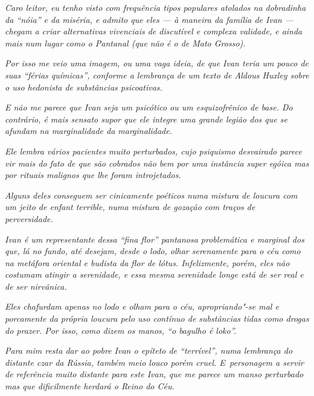 \emph{Caro leitor, eu tenho visto com frequência tipos populares
atolados na dobradinha da ``nóia'' e da miséria, e admito que eles --- à
maneira da família de Ivan --- chegam a criar alternativas vivenciais de
discutível e complexa validade, e ainda mais num lugar como o Pantanal
(que não é o de Mato Grosso).}~

\emph{Por isso me veio uma imagem, ou uma vaga ideia, de que Ivan teria
um pouco de suas ``férias químicas'', conforme a lembrança de um texto
de Aldous Huxley sobre o uso hedonista de substâncias psicoativas.}~

\emph{E não me parece que Ivan seja um psicótico ou um esquizofrênico de
base. Do contrário, é mais sensato supor que ele integre uma grande
legião dos que se afundam na marginalidade da marginalidade.}~

\emph{Ele lembra vários pacientes muito perturbados, cujo psiquismo
desvairado parece vir mais do fato de que são cobrados não bem por uma
instância super egóica mas por rituais malignos que lhe foram
introjetados.}~

\emph{Alguns deles conseguem ser cinicamente poéticos numa mistura de
loucura com um jeito de enfant terrible, numa mistura de gozação com
traços de perversidade.}~

\emph{Ivan é um representante dessa ``fina flor'' pantanosa problemática
e marginal dos que, lá no fundo, até desejam, desde o lodo, olhar
serenamente para o céu como na metáfora oriental e budista da flor de
lótus. Infelizmente, porém, eles não costumam atingir a serenidade, e
essa mesma serenidade longe está de ser real e de ser nirvânica.}~

\emph{Eles chafurdam apenas no lodo e olham para o céu, apropriando"-se
mal e porcamente da própria loucura pelo uso contínuo de substâncias
tidas como drogas do prazer. Por isso, como dizem os manos, ``o bagulho
é loko''.}

\emph{Para mim resta dar ao pobre Ivan o epíteto de ``terrível'', numa
lembrança do distante czar da Rússia, também meio louco porém cruel. E~personagem a servir de referência muito distante para este Ivan, que me
parece um manso perturbado mas que dificilmente herdará o Reino do Céu.}
